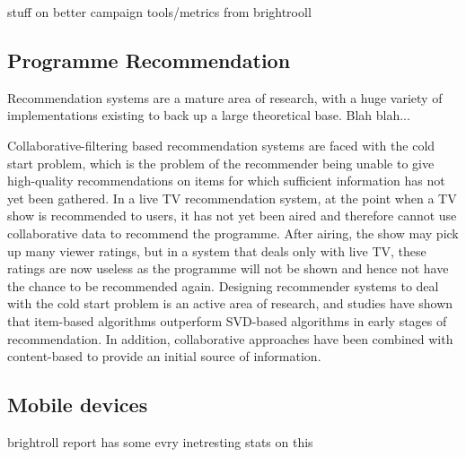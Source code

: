 	stuff on better campaign tools/metrics from brightrooll



	\subsection{Programme Recommendation}

	Recommendation systems are a mature area of research, with a huge variety of implementations existing to back up a large theoretical base. Blah blah...


	Collaborative-filtering based recommendation systems are faced with the cold start problem, which is the problem of the recommender being unable to give high-quality recommendations on items for which sufficient information has not yet been gathered. In a live TV recommendation system, at the point when a TV show is recommended to users, it has not yet been aired and therefore cannot use collaborative data to recommend the programme. After airing, the show may pick up many viewer ratings, but in a system that deals only with live TV, these ratings are now useless as the programme will not be shown and hence not have the chance to be recommended again. Designing recommender systems to deal with the cold start problem is an active area of research, and studies have shown that item-based algorithms outperform SVD-based algorithms in early stages of recommendation\cite{cold-start-problem}. In addition, collaborative approaches have been combined with content-based to provide an initial source of information\cite{generative_models}.

	\subsection{Mobile devices}

	brightroll report has some evry inetresting stats on this

